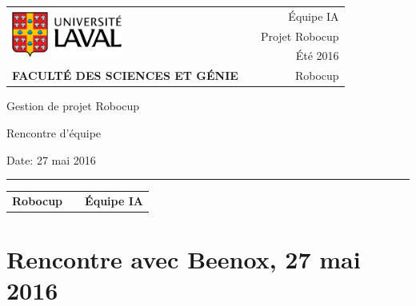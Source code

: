 \documentclass[12pt,letterpaper,twoside]{article}
\begin{document}
\setcounter{secnumdepth}{0}
\begin{titlepage}

        \vspace*{1cm}
        \begin{small}
        \begin{tabularx}{\textwidth}{ l X r }
        \multirow{3}{*}{\includegraphics[height=1.5cm,keepaspectratio]{ul_logo.pdf}}
        && \'Equipe IA\\
        && Projet Robocup\\
        && Été 2016\\

        \scriptsize{\textbf{FACULTÉ DES SCIENCES ET GÉNIE}} && Robocup
        \end{tabularx}
        \end{small}

        \vfill

        \begin{center}

        Gestion de projet Robocup

        \vspace{0.5cm}

        Rencontre d'\'equipe

        \vspace{2cm}

        \end{center}

        \vfill

        Date: 27 mai 2016

        \vspace{0.4cm}

        \rule{\textwidth}{2pt}

        \vspace{0.3cm}

        \begin{tabularx}{\textwidth}{ l X r }

        \textbf{Robocup} && \textbf{\'Equipe IA} \\

        \end{tabularx}


\end{titlepage}


\section*{Rencontre avec Beenox, 27 mai 2016}
\end{document}
